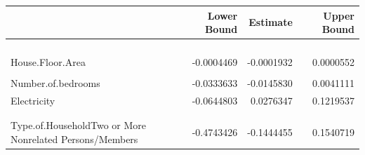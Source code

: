 \documentclass[
]{article}
\begin{document}
\begin{tabular}[t]{l|r|r|r}
\hline
  & Lower Bound & Estimate & Upper Bound\\
\hline
\cellcolor[HTML]{A1E8F1}{\textcolor{black}{(Intercept)}} & \cellcolor[HTML]{A1E8F1}{\textcolor{black}{1.2687606}} & \cellcolor[HTML]{A1E8F1}{\textcolor{black}{1.4254422}} & \cellcolor[HTML]{A1E8F1}{\textcolor{black}{1.5810043}}\\
\hline
\cellcolor[HTML]{A1E8F1}{\textcolor{black}{Total.Household.Income}} & \cellcolor[HTML]{A1E8F1}{\textcolor{black}{-0.0035110}} & \cellcolor[HTML]{A1E8F1}{\textcolor{black}{-0.0022045}} & \cellcolor[HTML]{A1E8F1}{\textcolor{black}{-0.0009192}}\\
\hline
\cellcolor[HTML]{A1E8F1}{\textcolor{black}{Total.Food.Expenditure}} & \cellcolor[HTML]{A1E8F1}{\textcolor{black}{0.0430507}} & \cellcolor[HTML]{A1E8F1}{\textcolor{black}{0.0500316}} & \cellcolor[HTML]{A1E8F1}{\textcolor{black}{0.0569775}}\\
\hline
\cellcolor[HTML]{A1E8F1}{\textcolor{black}{Household.Head.Age}} & \cellcolor[HTML]{A1E8F1}{\textcolor{black}{-0.0042279}} & \cellcolor[HTML]{A1E8F1}{\textcolor{black}{-0.0025205}} & \cellcolor[HTML]{A1E8F1}{\textcolor{black}{-0.0008148}}\\
\hline
House.Floor.Area & -0.0004469 & -0.0001932 & 0.0000552\\
\hline
\cellcolor[HTML]{A1E8F1}{\textcolor{black}{House.Age}} & \cellcolor[HTML]{A1E8F1}{\textcolor{black}{-0.0038392}} & \cellcolor[HTML]{A1E8F1}{\textcolor{black}{-0.0023168}} & \cellcolor[HTML]{A1E8F1}{\textcolor{black}{-0.0008069}}\\
\hline
Number.of.bedrooms & -0.0333633 & -0.0145830 & 0.0041111\\
\hline
Electricity & -0.0644803 & 0.0276347 & 0.1219537\\
\hline
\cellcolor[HTML]{A1E8F1}{\textcolor{black}{Household.Head.SexMale}} & \cellcolor[HTML]{A1E8F1}{\textcolor{black}{0.1623556}} & \cellcolor[HTML]{A1E8F1}{\textcolor{black}{0.2202770}} & \cellcolor[HTML]{A1E8F1}{\textcolor{black}{0.2788479}}\\
\hline
\cellcolor[HTML]{A1E8F1}{\textcolor{black}{Type.of.HouseholdSingle Family}} & \cellcolor[HTML]{A1E8F1}{\textcolor{black}{-0.3967514}} & \cellcolor[HTML]{A1E8F1}{\textcolor{black}{-0.3481835}} & \cellcolor[HTML]{A1E8F1}{\textcolor{black}{-0.2995260}}\\
\hline
Type.of.HouseholdTwo or More Nonrelated Persons/Members & -0.4743426 & -0.1444455 & 0.1540719\\
\hline
\end{tabular}
\end{document}

